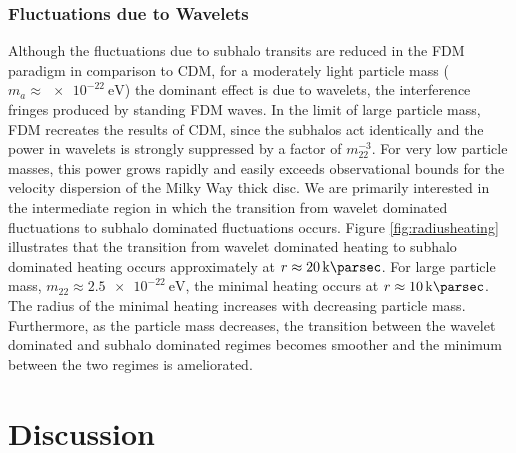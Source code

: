 \documentclass[usenatbib]{mnras}
\begin{document}
\subsubsection{Fluctuations due to Wavelets}
Although the fluctuations due to subhalo transits are reduced in the FDM paradigm in comparison to CDM, for a moderately light particle mass ($m_a \approx \SI{e-22}{\electronvolt}$) the dominant effect is due to wavelets, the interference fringes produced by standing FDM waves. In the limit of large particle mass, FDM recreates the results of CDM, since the subhalos act identically and the power in wavelets is strongly suppressed by a factor of $m_{22}^{-3}$. For very low particle masses, this power grows rapidly and easily exceeds observational bounds for the velocity dispersion of the Milky Way thick disc. We are primarily interested in the intermediate region in which the transition from wavelet dominated fluctuations to subhalo dominated fluctuations occurs. Figure \ref{fig:radiusheating} illustrates that the transition from wavelet dominated heating to subhalo dominated heating occurs approximately at $r \approx \SI{20}{\kilo \parsec}$. For large particle mass, $m_{22} \approx \SI{2.5e-22}{\electronvolt}$, the minimal heating occurs at $r \approx \SI{10}{\kilo \parsec}$. The radius of the minimal heating increases with decreasing particle mass. Furthermore, as the particle mass decreases, the transition between the wavelet dominated and subhalo dominated regimes becomes smoother and the minimum between the two regimes is ameliorated.   

\section{Discussion}
\end{document}

